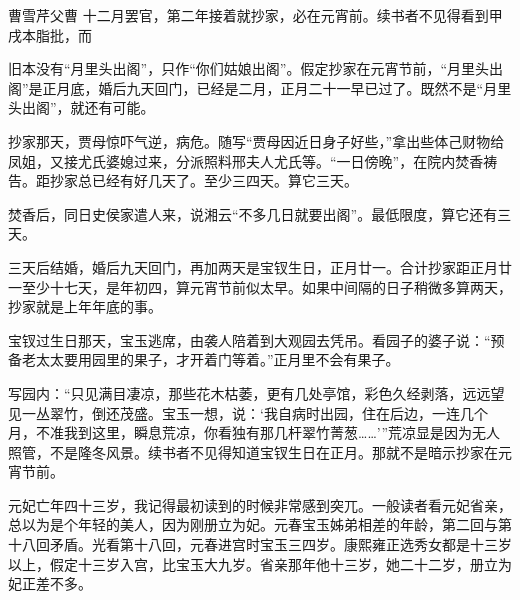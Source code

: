 \par 曹雪芹父曹 十二月罢官，第二年接着就抄家，必在元宵前。续书者不见得看到甲戌本脂批，而
\par 旧本没有“月里头出阁”，只作“你们姑娘出阁”。假定抄家在元宵节前，“月里头出阁”是正月底，婚后九天回门，已经是二月，正月二十一早已过了。既然不是“月里头出阁”，就还有可能。
\par 抄家那天，贾母惊吓气逆，病危。随写“贾母因近日身子好些，”拿出些体己财物给凤姐，又接尤氏婆媳过来，分派照料邢夫人尤氏等。“一日傍晚”，在院内焚香祷告。距抄家总已经有好几天了。至少三四天。算它三天。
\par 焚香后，同日史侯家遣人来，说湘云“不多几日就要出阁”。最低限度，算它还有三天。
\par 三天后结婚，婚后九天回门，再加两天是宝钗生日，正月廿一。合计抄家距正月廿一至少十七天，是年初四，算元宵节前似太早。如果中间隔的日子稍微多算两天，抄家就是上年年底的事。
\par 宝钗过生日那天，宝玉逃席，由袭人陪着到大观园去凭吊。看园子的婆子说：“预备老太太要用园里的果子，才开着门等着。”正月里不会有果子。
\par 写园内：“只见满目凄凉，那些花木枯萎，更有几处亭馆，彩色久经剥落，远远望见一丛翠竹，倒还茂盛。宝玉一想，说：‘我自病时出园，住在后边，一连几个月，不准我到这里，瞬息荒凉，你看独有那几杆翠竹菁葱……'”荒凉显是因为无人照管，不是隆冬风景。续书者不见得知道宝钗生日在正月。那就不是暗示抄家在元宵节前。
\par 元妃亡年四十三岁，我记得最初读到的时候非常感到突兀。一般读者看元妃省亲，总以为是个年轻的美人，因为刚册立为妃。元春宝玉姊弟相差的年龄，第二回与第十八回矛盾。光看第十八回，元春进宫时宝玉三四岁。康熙雍正选秀女都是十三岁以上，假定十三岁入宫，比宝玉大九岁。省亲那年他十三岁，她二十二岁，册立为妃正差不多。
